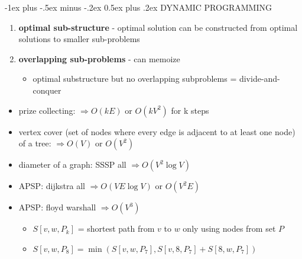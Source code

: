 \documentclass[10pt, landscape]{article}
\makeatletter
\renewcommand{\section}{\@startsection{section}{1}{0mm}%
                                {-1ex plus -.5ex minus -.2ex}%
                                {0.5ex plus .2ex}%
                                {\normalfont\large\bfseries}}
\let\then\Rightarrow
\makeatother
\begin{document}
\begin{minipage}{0.48\linewidth}   
    \begin{multicols}{2}
       \section{DYNAMIC PROGRAMMING}
        \begin{enumerate}
            \item \textbf{optimal sub-structure} - optimal solution can be constructed from optimal solutions to smaller sub-problems
            \item \textbf{overlapping sub-problems} - can memoize
            \begin{itemize}
                \item optimal substructure but no overlapping subproblems = divide-and-conquer
            \end{itemize}
        \end{enumerate}
        \begin{itemize}
            \item prize collecting: $\then O(kE)$ or $O(kV^2)$ for k steps
            \item vertex cover (set of nodes where every edge is adjacent to at least one node) of a tree: $\then O(V)$ or $O(V^2)$
            \item diameter of a graph: SSSP all $\then O(V^2 \log V)$
            \item APSP: dijkstra all $\then O(VE\log V)$ or $O(V^2E)$
            \item APSP: floyd warshall $\then O(V^3)$
            \begin{itemize}
                \item $S[v, w, P_k]$ = shortest path from $v$ to $w$ only using nodes from set $P$
                \item ${\scriptstyle S[v, w, P_8] = \min(S[v, w, P_7], S[v, 8, P_7] + S[8, w, P_7])}$
            \end{itemize}
        \end{itemize}
    \end{multicols}
\end{minipage}
\end{document}
